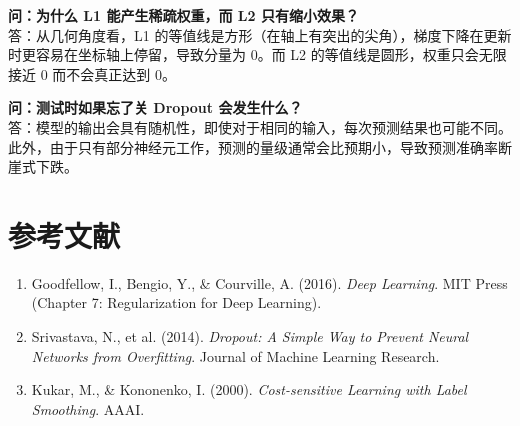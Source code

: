 \documentclass[12pt, a4paper]{article}
\begin{document}
\textbf{问：为什么 L1 能产生稀疏权重，而 L2 只有缩小效果？}\\
答：从几何角度看，L1 的等值线是方形（在轴上有突出的尖角），梯度下降在更新时更容易在坐标轴上停留，导致分量为 0。而 L2 的等值线是圆形，权重只会无限接近 0 而不会真正达到 0。

\textbf{问：测试时如果忘了关 Dropout 会发生什么？}\\
答：模型的输出会具有随机性，即使对于相同的输入，每次预测结果也可能不同。此外，由于只有部分神经元工作，预测的量级通常会比预期小，导致预测准确率断崖式下跌。

\section{参考文献}
\begin{enumerate}
    \item Goodfellow, I., Bengio, Y., \& Courville, A. (2016). \textit{Deep Learning}. MIT Press (Chapter 7: Regularization for Deep Learning).
    \item Srivastava, N., et al. (2014). \textit{Dropout: A Simple Way to Prevent Neural Networks from Overfitting}. Journal of Machine Learning Research.
    \item Kukar, M., \& Kononenko, I. (2000). \textit{Cost-sensitive Learning with Label Smoothing}. AAAI.
\end{enumerate}
\end{document}
